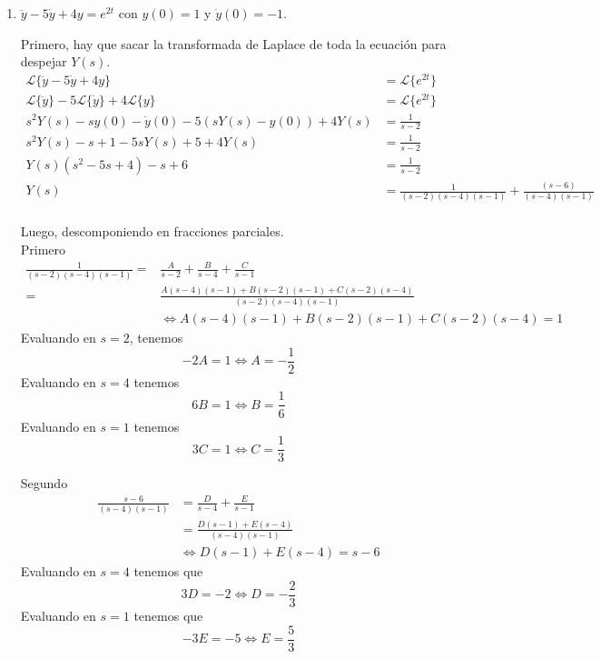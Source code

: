 \documentclass{article}
\begin{document}
\begin{enumerate}
        \item {
            $\ddot y - 5 \dot y + 4y = e^{2t}$ con $y(0) = 1$ y $\dot y(0) = -1$.

            \color{azul}
            Primero, hay que sacar la transformada de Laplace de toda la ecuación
            para despejar $Y(s)$.
            \begin{align*}
                \mathcal{L}\{\ddot y - 5 \dot y + 4y\} &= \mathcal{L}\{e^{2t}\} \\
                \mathcal{L}\{\ddot y\} - 5\mathcal{L}\{\dot y\} + 4 \mathcal{L}\{y\}
                &= \mathcal{L}\{e^{2t}\} \\
                s^2 Y(s) - s y(0) - \dot y(0) - 5 (sY(s) - y(0)) + 4Y(s) 
                &= \frac{1}{s - 2} \\
                s^2 Y(s) - s + 1 - 5s Y(s) + 5 + 4 Y(s) &= \frac{1}{s - 2} \\
                Y(s) (s^2 - 5s + 4) - s + 6 &= \frac{1}{s - 2} \\
                Y(s) &= \frac{1}{(s-2)(s-4)(s-1)} + \frac{(s-6)}{(s-4)(s-1)}\\
            \end{align*}

            Luego, descomponiendo en fracciones parciales.\\
            Primero
            \begin{align*}
                \frac{1}{(s-2)(s-4)(s-1)}=&\frac{A}{s-2} + \frac{B}{s-4} + \frac{C}{s-1} \\
                =&\frac{A(s-4)(s-1) + B(s-2)(s-1) + C(s-2)(s-4)}{(s-2)(s-4)(s-1)} \\
                &\iff A(s-4)(s-1) + B(s-2)(s-1) + C(s-2)(s-4) = 1
            \end{align*}
            Evaluando en $s = 2$, tenemos
            \[-2A = 1 \iff A = -\frac{1}{2}\]
            Evaluando en $s = 4$ tenemos
            \[6B = 1 \iff B = \frac{1}{6}\]
            Evaluando en $s = 1$ tenemos
            \[3C = 1 \iff C = \frac{1}{3}\]

            Segundo
            \begin{align*}
                \frac{s-6}{(s-4)(s-1)} &= \frac{D}{s-4} + \frac{E}{s-1} \\
                &= \frac{D(s-1) + E(s-4)}{(s-4)(s-1)} \\
                &\iff D(s-1) + E(s-4) = s-6
            \end{align*}
            Evaluando en $s = 4$ tenemos que
            \[3D = -2 \iff D = -\frac{2}{3}\]
            Evaluando en $s = 1$ tenemos que
            \[-3E = -5 \iff E = \frac{5}{3}\]

}
\end{enumerate}
\end{document}
